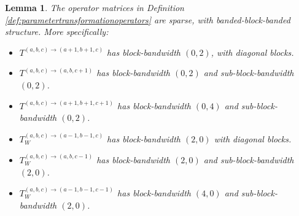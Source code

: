 \documentclass[11pt, oneside]{article}   	%
\newtheorem{lemma}{Lemma}
\begin{document}
\begin{lemma}\label{lemma:sparsityofparametertransformationoperators}
The operator matrices in Definition \ref{def:parametertransformationoperators} are sparse, with banded-block-banded structure. More specifically:
\begin{itemize}
	\item $T^{(a,b,c)\to(a+1,b+1,c)}$ has block-bandwidth $(0,2)$, with diagonal blocks.
  	\item $T^{(a,b,c)\to(a,b,c+1)}$ has block-bandwidth $(0,2)$ and sub-block-bandwidth $(0,2)$.
	\item $T^{(a,b,c)\to(a+1,b+1,c+1)}$ has block-bandwidth $(0,4)$ and sub-block-bandwidth $(0,2)$.
	\item $T_W^{(a,b,c)\to(a-1,b-1,c)}$ has block-bandwidth $(2,0)$ with diagonal blocks.
  	\item $T_W^{(a,b,c)\to(a,b,c-1)}$ has block-bandwidth $(2,0)$ and sub-block-bandwidth $(2,0)$.
	\item $T_W^{(a,b,c)\to(a-1,b-1,c-1)}$ has block-bandwidth $(4,0)$ and sub-block-bandwidth $(2,0)$.
\end{itemize}
\end{lemma}
\end{document}
